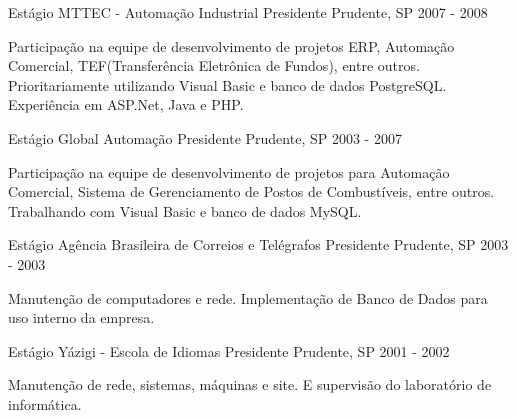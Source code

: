 \begin{cventries}
\cventry
{Estágio} %
{MTTEC - Automação Industrial} %
{Presidente Prudente, SP} %
{2007 - 2008} %
{
  \begin{cvitems} %
    \item {Participação na equipe de desenvolvimento de projetos ERP, Automação Comercial, TEF(Transferência Eletrônica de Fundos), entre outros. Prioritariamente utilizando Visual Basic e banco de dados PostgreSQL. Experiência em ASP.Net, Java e PHP.}
  \end{cvitems}
}


\cventry
{Estágio} %
{Global Automação} %
{Presidente Prudente, SP} %
{2003 - 2007} %
{
  \begin{cvitems} %
    \item {Participação na equipe de desenvolvimento de projetos para Automação Comercial, Sistema de Gerenciamento de Postos de Combustíveis, entre outros. Trabalhando com Visual Basic e banco de dados MySQL.}
  \end{cvitems}
}


\cventry
{Estágio} %
{Agência Brasileira de Correios e Telégrafos} %
{Presidente Prudente, SP} %
{2003 - 2003} %
{
  \begin{cvitems} %
    \item {Manutenção de computadores e rede. Implementação de Banco de Dados para uso interno da empresa.}
  \end{cvitems}
}


\cventry
{Estágio} %
{Yázigi - Escola de Idiomas} %
{Presidente Prudente, SP} %
{2001 - 2002} %
{
  \begin{cvitems} %
    \item {Manutenção de rede, sistemas, máquinas e site. E supervisão do laboratório de informática.}
  \end{cvitems}
}


\end{cventries}
